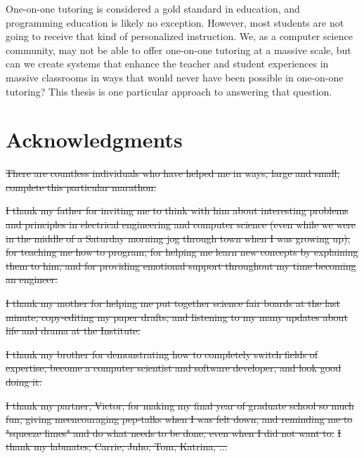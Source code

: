 \documentclass[12pt,twoside]{mitthesis}
\providecommand{\DIFdeltex}[1]{{\protect\color{red}\sout{#1}}}                      %
\providecommand{\DIFdelbegin}{} %
\providecommand{\DIFdel}[1]{\texorpdfstring{\DIFdeltex{#1}}{}} %
\begin{document}
One-on-one tutoring is considered a gold standard in education, and programming education is likely no exception. However, most students are not going to receive that kind of personalized instruction. We, as a computer science community, may not be able to offer one-on-one tutoring at a massive scale, but can we create systems that enhance the teacher and student experiences in massive classrooms in ways that would never have been possible in one-on-one tutoring? This thesis is one particular approach to answering that question. %


\cleardoublepage

\section*{Acknowledgments}

\DIFdelbegin %
\DIFdel{There are countless individuals who have helped me in ways, large and small, complete this particular marathon. 
}%

\DIFdel{I thank my father for inviting me to think with him about interesting problems and principles in electrical engineering and computer science (even while we were in the middle of a Saturday morning jog through town when I was growing up), for teaching me how to program, for helping me learn new concepts by explaining them to him, and for providing emotional support throughout my time becoming an engineer. 
}%

\DIFdel{I thank my mother for helping me put together science fair boards at the last minute, copy-editing my paper drafts, and listening to my many updates about life and drama at the Institute.
}%

\DIFdel{I thank my brother for demonstrating how to completely switch fields of expertise, become a computer scientist and software developer, and look good doing it.
}%

\DIFdel{I thank my partner, Victor, for making my final year of graduate school so much fun, giving meencouraging pep-talks when I was felt down, and reminding me to "squeeze limes" and do what needs to be done, even when I did not want to.
}%
\DIFdel{I thank my labmates, Carrie, Juho, Tom, Katrina, ... }%
\end{document}
